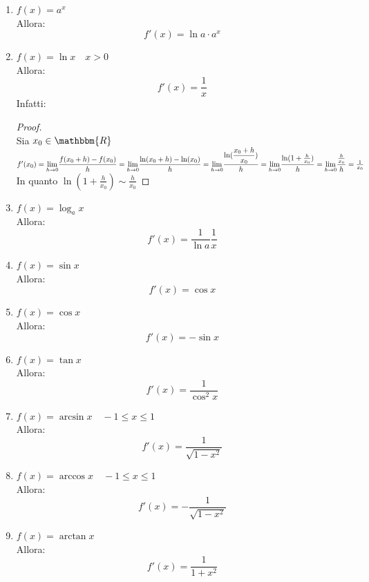 \documentclass[12pt]{report}
\begin{document}
\begin{enumerate}[label = (\arabic*)]
 		Allora:
 		\[
 		f'(x) = e^x \quad \forall x \in \mathbbm{R}
 		\]
 		Infatti:
 		\begin{proof} \quad \\
 			Sia $x_0 \in \mathbbm{R}$ \\
 			$f'(x_0) = \mathlarger{\lim_{h \to 0}}\dfrac{f(x_0 + h) - f(x_0)}{h} = \mathlarger{\lim_{h \to 0}}\dfrac{e^{x_0 + h} - e^{x_0}}{h} = \mathlarger{\lim_{h \to 0}}e^{x_0}(\dfrac{e^h - 1}{h}) = e^{x_0}$
 		\end{proof}
 		\item $f(x) = a^x$ \\
 		Allora:
 		\[f'(x) = \ln a \cdot a^x\]
 		\item $f(x) = \ln x \quad x > 0$ \\
 		Allora: \[
 		f'(x) = \dfrac{1}{x}
 		\]
 		Infatti:
 		\begin{proof} \quad \\
 			Sia $x_0 \in \mathbbm{R}$ \\
 			$f'(x_0) = \mathlarger{\lim_{h \to 0}}\dfrac{f(x_0 + h) - f(x_0)}{h} = \mathlarger{\lim_{h \to 0}}\dfrac{\ln(x_0 + h) - \ln(x_0)}{h} = \mathlarger{\lim_{h \to 0}}\dfrac{\ln(\dfrac{x_0 + h}{x_0})}{h} = \mathlarger{\lim_{h \to 0}}\dfrac{\ln(1 + \frac{h}{x_0})}{h} = \mathlarger{\lim_{h \to 0}}\dfrac{\frac{h}{x_0}}{h} = \frac{1}{x_0}$ \\
 			In quanto $\ln(1 + \frac{h}{x_0}) \sim \frac{h}{x_0}$
 		\end{proof}
 		\item $f(x) = \log_a x$ \\
 		Allora:
 		\[
 		f'(x) = \dfrac{1}{\ln a} \dfrac{1}{x}
 		\]
 		\item $f(x) = \sin x$ \\
 		Allora: \[f'(x) = \cos x\]
 		\item $f(x) = \cos x$ \\
 		Allora: \[
		f'(x) = -\sin x
 		\]
 		\item $f(x) = \tan x$ \\
 		Allora:
 		\[f'(x) = \dfrac{1}{\cos^2 x}\]
		\item $f(x) = \arcsin x \quad -1 \leq x \leq 1$ \\
		Allora:
		\[
		f'(x) = \dfrac{1}{\sqrt{1- x^2}}
		\]
		\item $f(x) = \arccos x \quad -1 \leq x \leq 1$ \\
		Allora: \[f'(x) = -\dfrac{1}{\sqrt{1 - x^2}}\]
		\item $f(x) = \arctan x$ \\
		Allora: \[f'(x) = \dfrac{1}{1+x^2}\]
 	\end{enumerate}
\end{document}

